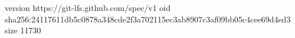 version https://git-lfs.github.com/spec/v1
oid sha256:24117611db5c0878a348cde2f3a702115ec3ab8907c3af09bb05c4cee69d4ed3
size 11730
